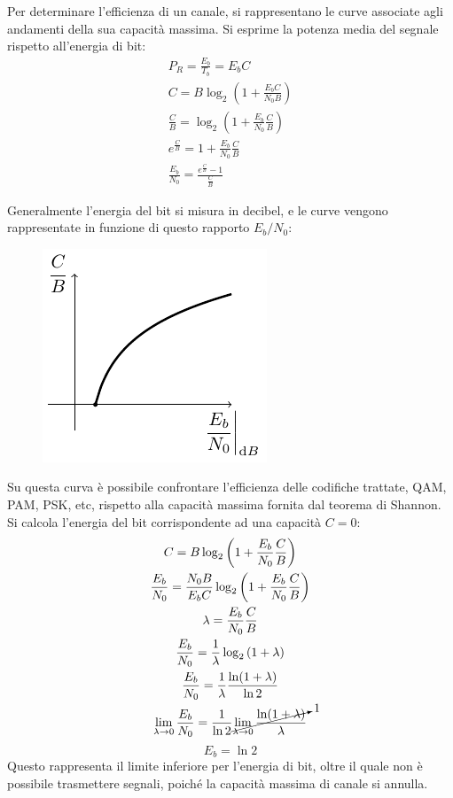 \documentclass{article}
\numberwithin{equation}{subsection}
\begin{document}
Per determinare l'efficienza di un canale, si rappresentano le curve associate agli andamenti della sua capacità massima. Si esprime la potenza media del segnale 
rispetto all'energia di bit:
\begin{gather*}
    P_R=\displaystyle\frac{E_b}{T_b}=E_bC\\
    C=B\log_2\left(\displaystyle 1+\frac{E_bC}{N_0B}\right)\\
    \displaystyle\frac{C}{B}=\log_2\left(1+\frac{E_b}{N_0}\frac{C}{B}\right)\\
    e^{\frac{C}{B}}=1+\displaystyle\frac{E_b}{N_0}\frac{C}{B}\\
    \displaystyle\frac{E_b}{N_0}=\frac{e^{\frac{C}{B}}-1}{\displaystyle\frac{C}{B}}
\end{gather*}

Generalmente l'energia del bit si misura in decibel, e le curve vengono rappresentate in funzione di questo rapporto $E_b/N_0$:
\begin{figure}[H]%
    \centering
    \includegraphics{shannon.pdf}
\end{figure}
Su questa curva è possibile confrontare l'efficienza delle codifiche trattate, QAM, PAM, PSK, etc, rispetto alla capacità massima fornita dal teorema di Shannon. 
Si calcola l'energia del bit corrispondente ad una capacità $C=0$:
\begin{gather*}
    C=B\log_2\left(\displaystyle 1+\frac{E_b}{N_0}\frac{C}{B}\right)\\
    \displaystyle\frac{E_b}{N_0}=\frac{N_0B}{E_bC}\log_2\left(1+\frac{E_b}{N_0}\frac{C}{B}\right)\\
    \lambda=\displaystyle\frac{E_b}{N_0}\frac{C}{B}\\
    \displaystyle\frac{E_b}{N_0}=\frac{1}{\lambda}\log_2\left(1+\lambda\right)\\
    \displaystyle\frac{E_b}{N_0}=\frac{1}{\lambda}\frac{\ln(1+\lambda)}{\ln2}\\
    \lim_{\lambda\to0}\displaystyle\frac{E_b}{N_0}=\frac{1}{\ln2}\cancelto{1}{\lim_{\lambda\to0}\frac{\ln(1+\lambda)}{\lambda}}
\end{gather*}
\begin{equation}
    E_b=\ln2
\end{equation}
Questo rappresenta il limite inferiore per l'energia di bit, oltre il quale non è possibile trasmettere segnali, poiché la capacità massima di canale si annulla.  
\end{document}
